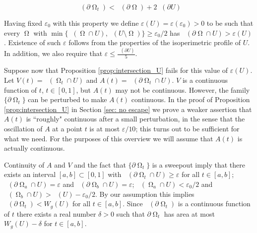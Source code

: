\documentclass[12pt]{amsart}
\DeclareMathOperator{\Hn}{\mathcal{H}^n}
\DeclareMathOperator{\Hnn}{\mathcal{H}^{n+1}}
\DeclareMathOperator{\Om}{\Omega}
\theoremstyle{definition}
\begin{document}
\begin{equation} \label{pushing out small set}
    \Hn(\partial \Om_t) < \Hn(\partial \Om) + 2 \Hn(\partial U)
\end{equation}

Having fixed $\varepsilon_0$ with this property
we define $\varepsilon(U) = \varepsilon(\varepsilon_0)>0$
to be such that every $\Om$ with
$\min \{\Hnn(\Om \cap U), \Hnn(U \setminus \Om)\} \geq \varepsilon_0/2$
has $\Hn(\partial \Om \cap U) > \varepsilon(U)$.
Existence of such $\varepsilon$ follows from the properties
of the isoperimetric profile of $U$.
In addition, we also require that $\varepsilon \leq \frac{\Hn(\partial U)}{5}$.


Suppose now that Proposition \ref*{prop:intersection_U} fails for this value of $\varepsilon(U)$.  
Let $V(t) = \Hnn(\Om_t \cap U)$ and
$A(t) = \Hn(\partial \Om_t \cap U)$. $V$ is a continuous function of $t$, $t \in [0,1]$, but $A(t)$ may not be continuous.
However, the family $\{ \partial \Om_t \}$
can be perturbed to make
$A(t)$ continuous.
In the proof of Proposition \ref*{prop:intersection_U} in Section \ref*{sec: no escape}
we prove a weaker assertion that
$A(t)$ is ``roughly" continuous after a small perturbation,
in the sense that the oscillation of $A$ at a point $t$ is at most $\varepsilon/10$;
this turns out to be sufficient for what we need.
For the purposes of this overview we will assume that $A(t)$ is actually continuous.

Continuity of $A$ and $V$ and the fact that $\{ \partial \Om_t \}$ is a sweepout
imply that there exists an interval $[a,b] \subset [0,1]$
with $\Hn(\partial \Om_t \cap U) \geq \varepsilon$ for all $t \in [a,b]$;
$\Hn(\partial \Om_a \cap U) = \varepsilon$ and $\Hn(\partial \Om_b \cap U) = \varepsilon$; 
$\Hnn(\Om_a \cap U) < \varepsilon_0/2$ and $\Hnn(\Om_b \cap U) > \Hnn(U)-\varepsilon_0/2$.
By our assumption this implies
$\Hn(\partial \Om_t) < W_g(U)$ for all $t \in [a,b]$.
Since $\Hn(\partial \Om_t)$ is a continuous function of $t$
there exists a real number $\delta > 0$
such that $\partial \Om_t$ has area at most $W_g(U) - \delta$ for $t \in [a,b]$.
\end{document}
